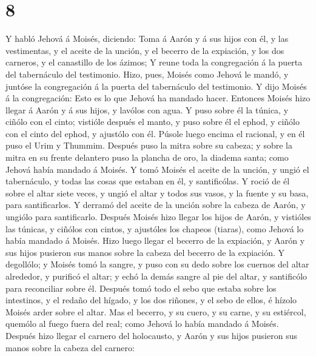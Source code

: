 \hypertarget{section-7}{%
\section{8}\label{section-7}}

 Y habló Jehová á Moisés, diciendo:  Toma á
Aarón y á sus hijos con él, y las vestimentas, y el aceite de la unción,
y el becerro de la expiación, y los dos carneros, y el canastillo de los
ázimos;  Y reune toda la congregación á la puerta del
tabernáculo del testimonio.  Hizo, pues, Moisés como Jehová
le mandó, y juntóse la congregación á la puerta del tabernáculo del
testimonio.  Y dijo Moisés á la congregación: Esto es lo que
Jehová ha mandado hacer.  Entonces Moisés hizo llegar á
Aarón y á sus hijos, y lavólos con agua.  Y puso sobre él la
túnica, y ciñólo con el cinto; vistióle después el manto, y puso sobre
él el ephod, y ciñólo con el cinto del ephod, y ajustólo con él.
 Púsole luego encima el racional, y en él puso el Urim y
Thummim.  Después puso la mitra sobre su cabeza; y sobre la
mitra en su frente delantero puso la plancha de oro, la diadema santa;
como Jehová había mandado á Moisés.  Y tomó Moisés el
aceite de la unción, y ungió el tabernáculo, y todas las cosas que
estaban en él, y santificólas.  Y roció de él sobre el
altar siete veces, y ungió el altar y todos sus vasos, y la fuente y su
basa, para santificarlos.  Y derramó del aceite de la
unción sobre la cabeza de Aarón, y ungiólo para santificarlo.
 Después Moisés hizo llegar los hijos de Aarón, y vistióles
las túnicas, y ciñólos con cintos, y ajustóles los chapeos (tiaras),
como Jehová lo había mandado á Moisés.  Hizo luego llegar
el becerro de la expiación, y Aarón y sus hijos pusieron sus manos sobre
la cabeza del becerro de la expiación.  Y degollólo; y
Moisés tomó la sangre, y puso con su dedo sobre los cuernos del altar
alrededor, y purificó el altar; y echó la demás sangre al pie del altar,
y santificólo para reconciliar sobre él.  Después tomó todo
el sebo que estaba sobre los intestinos, y el redaño del hígado, y los
dos riñones, y el sebo de ellos, é hízolo Moisés arder sobre el altar.
 Mas el becerro, y su cuero, y su carne, y su estiércol,
quemólo al fuego fuera del real; como Jehová lo había mandado á Moisés.
 Después hizo llegar el carnero del holocausto, y Aarón y
sus hijos pusieron sus manos sobre la cabeza del carnero: 
